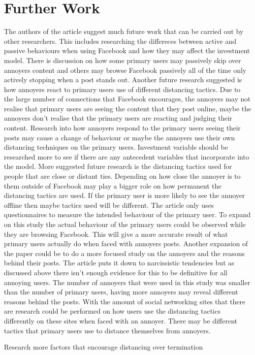 \documentclass[12pt]{article}
\begin{document}
\section{Further Work}
The authors of the article suggest much future work that can be carried out by other researchers. This includes researching the differeces between active and passive behaviours when using Facebook and how they may affect the investment model. There is discussion on how some primary users may passively skip over annoyers content and others may browse Facebook passively all of the time only actively stopping when a post stands out. Another future research suggested is how annoyers react to primary users use of different distancing tactics. Due to the large number of connections that Facebook encourages, the annoyers may not realise that primary users are seeing the content that they post online, maybe the annoyers don't realise that the primary users are reacting and judging their content. Research into how annoyers respond to the primary users seeing their posts may cause a change of behaviour or maybe the annoyers use their own distancing techniques on the primary users. 
Investment variable should be researched more to see if there are any antecedent variables that incorporate into the model.
More suggested future research is the distancing tactics used for people that are close or distant ties. Depending on how close the annoyer is to them outside of Facebook may play a bigger role on how permanent the distancing tactics are used. If the primary user is more likely to see the annoyer offline then maybe tactics used will be different.
The article only uses questionnaires to measure the intended behaviour of the primary user. To expand on this study the actual behaviour of the primary users could be observed while they are browsing Facebook. This will give a more accurate result of what primary users actually do when faced with annoyers posts. Another expansion of the paper could be to do a more focused study on the annoyers and the reasons behind their posts. The article puts it down to narcissistic tendencies but as discussed above there isn't enough evidence for this to be definitive for all annoying users. The number of annoyers that were used in this study was smaller than the number of primary users, having more annoyers may reveal different reasons behind the posts.
With the amount of social networking sites that there are research could be performed on how users use the distancing tactics differently on these sites when faced with an annoyer. There may be different tactics that primary users use to distance themselves from annoyers. 

Research more factors that encourage distancing over termination

\cite{Carpenter}



\end{document}
